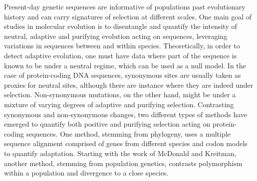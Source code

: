 \documentclass{article}
\begin{document}
    Present-day genetic sequences are informative of populations past evolutionary history and can carry signatures of selection at different scales.
    One main goal of studies in molecular evolution is to disentangle and quantify the intensity of neutral, adaptive and purifying evolution acting on sequences, leveraging variations in sequences between and within species.
    Theoretically, in order to detect adaptive evolution, one must have data where part of the sequence is known to be under a neutral regime, which can be used as a null model.
    In the case of protein-coding DNA sequences, synonymous sites are usually taken as proxies for neutral sites, although there are instance where they are indeed under selection\cite{bailey_adaptive_2014}.
    Non-synonymous mutations, on the other hand, might be under a mixture of varying degrees of adaptive and purifying selection.
    Contrasting synonymous and non-synonymous changes, two different types of methods have emerged to quantify both positive and purifying selection acting on protein-coding sequences.
    One method, stemming from phylogeny, uses a multiple sequence alignment comprised of genes from different species and codon models to quantify adaptation.
    Starting with the work of McDonald and Kreitman\cite{mcdonald_adaptative_1991}, another method, stemming from population genetics, contrasts polymorphism within a population and divergence to a close species.
\end{document}
